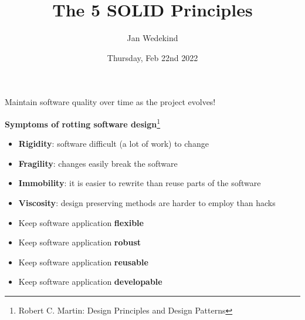 \documentclass[calcdimensions,landscape,letterpaper]{powersem}
\title{The 5 SOLID Principles}
\author{Jan Wedekind}
\date{Thursday, Feb 22nd 2022}
\newcommand{\thecurrentheading}{}
\newcommand{\heading}[1]{\renewcommand{\thecurrentheading}{#1}}
\begin{document}
\begin{slide}
  \heading{\ }
  \begin{center}
    \maketitle
  \end{center}
\end{slide}

\begin{slide}
  \heading{Motivation}
  \begin{center}
    Maintain software quality over time as the project evolves!
  \end{center}
\end{slide}

\begin{slide}
  \heading{Software Rot}
  \begin{center}
    \textbf{Symptoms of rotting software design}\footnote{Robert C. Martin: Design Principles and Design Patterns}
    \begin{itemize}
      \item \textbf{Rigidity}: software difficult (a lot of work) to change
      \item \textbf{Fragility}: changes easily break the software
      \item \textbf{Immobility}: it is easier to rewrite than reuse parts of the software
      \item \textbf{Viscosity}: design preserving methods are harder to employ than hacks
    \end{itemize}
  \end{center}
\end{slide}

\begin{slide}
  \heading{Software Design}
  \begin{center}
    \begin{itemize}
      \item Keep software application \textbf{flexible}
      \item Keep software application \textbf{robust}
      \item Keep software application \textbf{reusable}
      \item Keep software application \textbf{developable}
    \end{itemize}
  \end{center}
\end{slide}
\end{document}
